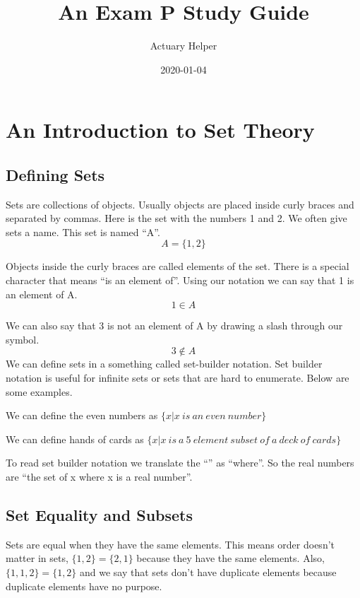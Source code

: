 \documentclass[
]{book}
\title{An Exam P Study Guide}
\author{Actuary Helper}
\date{2020-01-04}
\theoremstyle{definition}
\theoremstyle{definition}
\theoremstyle{definition}
\theoremstyle{remark}
\begin{document}
\frontmatter
\maketitle

{
\setcounter{tocdepth}{1}
\tableofcontents
}
\mainmatter
\hypertarget{an-introduction-to-set-theory}{%
\chapter{An Introduction to Set Theory}\label{an-introduction-to-set-theory}}

\hypertarget{defining-sets}{%
\section{Defining Sets}\label{defining-sets}}

Sets are collections of objects. Usually objects are placed inside curly braces and separated by commas. Here is the set with the numbers 1 and 2. We often give sets a name. This set is named ``A''. \[A=\{1,2\}\]

Objects inside the curly braces are called elements of the set. There is a special character that means ``is an element of''. Using our notation we can say that 1 is an element of A. \[1 \in A\]

We can also say that 3 is not an element of A by drawing a slash through our symbol.
\[3 \not\in A\]
We can define sets in a something called set-builder notation. Set builder notation is useful for infinite sets or sets that are hard to enumerate. Below are some examples.

We can define the even numbers as \(\{x | x \ is \  an \  even \ number\}\)

We can define hands of cards as \(\{x | x \ is \  a \ 5 \ element \ subset \ of \ a \ deck \ of \ cards\}\)

To read set builder notation we translate the ``\textbar{}'' as ``where''. So the real numbers are ``the set of x where x is a real number''.

\hypertarget{set-equality-and-subsets}{%
\section{Set Equality and Subsets}\label{set-equality-and-subsets}}

Sets are equal when they have the same elements. This means order doesn't matter in sets, \(\{1,2\} = \{2,1\}\) because they have the same elements. Also, \(\{1,1,2\} = \{1,2\}\) and we say that sets don't have duplicate elements because duplicate elements have no purpose.
\end{document}
